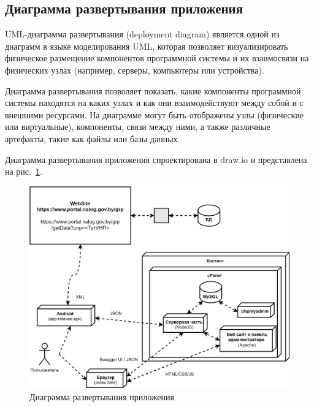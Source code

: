 \subsection*{Диаграмма развертывания приложения}

UML-диаграмма развертывания (deployment diagram) является одной из диаграмм в языке моделирования UML,
которая позволяет визуализировать физическое размещение компонентов программной системы и их взаимосвязи на физических узлах
(например, серверы, компьютеры или устройства).

Диаграмма развертывания позволяет показать, какие компоненты программной системы находятся на каких узлах
и как они взаимодействуют между собой и с внешними ресурсами.
На диаграмме могут быть отображены узлы (физические или виртуальные),
компоненты, связи между ними, а также различные артефакты, такие как файлы или базы данных.

Диаграмма развертывания приложения спроектирована в draw.io и представлена на рис.~\ref{fig:UML_deployment_diagram_prod}.

\begin{figure}[!htb]
    \centering

    \includegraphics[width=18cm]
    {images/UML/UML_deployment_diagram_prod.png}

    \caption{Диаграмма развертывания приложения}

    \label{fig:UML_deployment_diagram_prod}
\end{figure}
